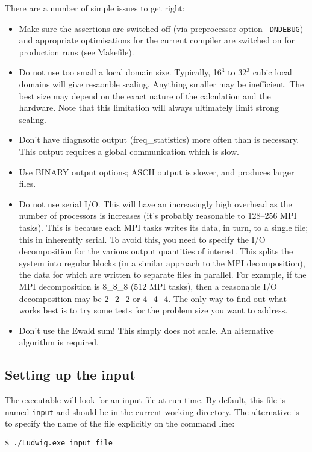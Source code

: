 There are a number of simple issues to get right:
\begin{itemize}
\item
Make sure the assertions are switched off (via preprocessor option
\texttt{-DNDEBUG}) and appropriate optimisations
for the current compiler are switched on for production runs (see Makefile).
\item
Do not use too small a local domain size. Typically, 16$^3$ to 32$^3$
cubic local domains will give resaonble scaling. Anything smaller may
be inefficient. The best size may depend on the exact nature of the
calculation and the hardware. Note that this limitation will always
ultimately limit strong scaling.
\item
Don't have diagnsotic output (freq\_statistics) more often than is
necessary. This output requires a global communication which is slow.
\item
Use BINARY output options; ASCII output is slower, and produces larger
files.
\item
Do not use serial I/O. This will have an increasingly high overhead as
the number of processors is increases (it's probably reasonable to
128--256 MPI tasks). This is because each MPI tasks writes its data,
in turn, to a single file; this in inherently serial. To avoid this,
you need to specify the I/O decomposition for the various output
quantities of interest. This splits the system into regular blocks
(in a similar approach to the MPI decomposition), the data for which
are written to separate files in parallel. For example, if the MPI
decomposition is 8\_8\_8 (512 MPI tasks), then a reasonable I/O
decomposition may be 2\_2\_2 or 4\_4\_4. The only way to find out
what works best is to try some tests for the problem size you want to
address.
\item
Don't use the Ewald sum! This simply does not scale.
An alternative algorithm is required.
\end{itemize}

\subsection{Setting up the input}

The executable will look for an input file at run time.
By default, this file is named \texttt{input} and should be in the
current working directory. The alternative is to specify the name
of the file explicitly on the command line:
\begin{verbatim}
$ ./Ludwig.exe input_file
\end{verbatim}

